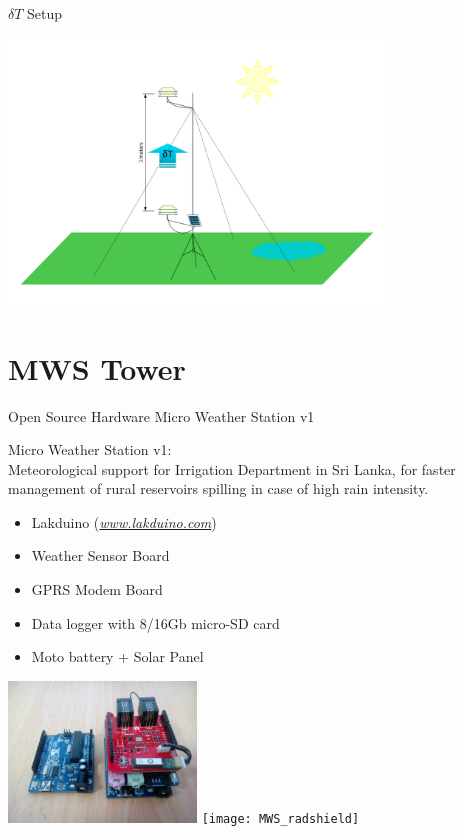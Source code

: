 \documentclass[xcolor=dvipsnames,beamer]{beamer} %
\begin{document}
\begin{frame}[fragile]{ $\delta T$ Setup}

\begin{center}
 \includegraphics[width=10cm]{MWS_v1_deltaT_sketch_cold}
\end{center}

\end{frame}

\section{ MWS Tower}
\begin{frame}[fragile]{Open Source Hardware Micro Weather Station v1}

Micro Weather Station v1:\\
Meteorological support for Irrigation Department in Sri Lanka, for faster management of rural reservoirs spilling in case of high rain intensity.
\vspace{5mm}
\begin{itemize}
 \item Lakduino (\href{www.lakduino.com}{\textit{www.lakduino.com}})
 \item Weather Sensor Board
 \item GPRS Modem Board
 \item Data logger with 8/16Gb micro-SD card
 \item Moto battery + Solar Panel
\end{itemize}
\begin{flushright}
  \includegraphics[width=5cm]{MWSv1}
  \hspace{5mm}
  \texttt{[image: MWS\_radshield]}
\end{flushright}
\end{frame}
\end{document}
